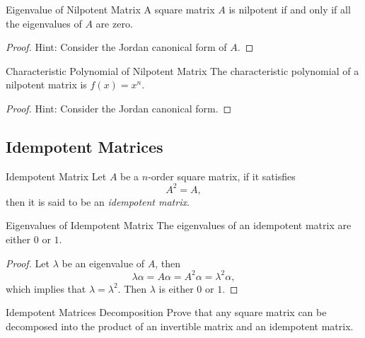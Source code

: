 \begin{proposition}{Eigenvalue of Nilpotent Matrix}{}
  A square matrix $A$ is nilpotent if and only if all the eigenvalues of $A$ are
  zero.
\end{proposition}

\begin{proof}
  Hint: Consider the Jordan canonical form of $A$.
\end{proof}

\begin{corollary}{Characteristic Polynomial of Nilpotent Matrix}{}
  The characteristic polynomial of a nilpotent matrix is $f(x) = x^n$.
\end{corollary}

\begin{proof}
  Hint: Consider the Jordan canonical form.
\end{proof}

\subsection{Idempotent Matrices}

\begin{definition}{Idempotent Matrix}{}
  Let $A$ be a $n$-order square matrix, if it satisfies
  \begin{equation}
    A^2 = A,
  \end{equation}
  then it is said to be an \emph{idempotent matrix}.
\end{definition}

\begin{proposition}{Eigenvalues of Idempotent Matrix}{}
  The eigenvalues of an idempotent matrix are either $0$ or $1$.
\end{proposition}

\begin{proof}
  Let $\lambda$ be an eigenvalue of $A$, then
  \begin{equation}
    \lambda \alpha = A \alpha = A^2\alpha = \lambda^2\alpha,
  \end{equation}
  which implies that $\lambda = \lambda^2$.
  Then $\lambda$ is either $0$ or $1$.
\end{proof}

\begin{example}{Idempotent Matrices Decomposition}{}
  Prove that any square matrix can be decomposed into the product
  of an invertible matrix and an idempotent matrix.
\end{example}

